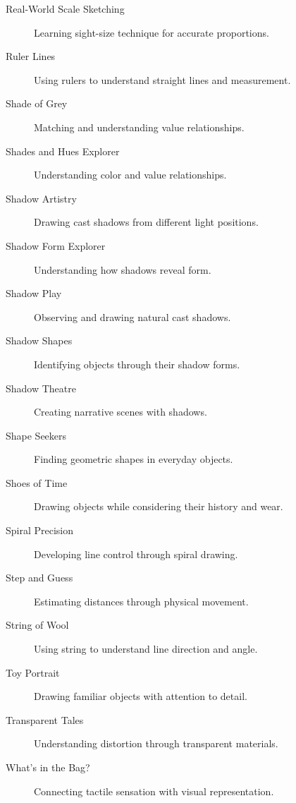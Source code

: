 \documentclass{article}
\begin{document}
\begin{description}
    \item[Real-World Scale Sketching] Learning sight-size technique for accurate proportions.
    
    \item[Ruler Lines] Using rulers to understand straight lines and measurement.
    
    \item[Shade of Grey] Matching and understanding value relationships.
    
    \item[Shades and Hues Explorer] Understanding color and value relationships.
    
    \item[Shadow Artistry] Drawing cast shadows from different light positions.
    
    \item[Shadow Form Explorer] Understanding how shadows reveal form.
    
    \item[Shadow Play] Observing and drawing natural cast shadows.
    
    \item[Shadow Shapes] Identifying objects through their shadow forms.
    
    \item[Shadow Theatre] Creating narrative scenes with shadows.
    
    \item[Shape Seekers] Finding geometric shapes in everyday objects.
    
    \item[Shoes of Time] Drawing objects while considering their history and wear.
    
    \item[Spiral Precision] Developing line control through spiral drawing.
    
    \item[Step and Guess] Estimating distances through physical movement.
    
    \item[String of Wool] Using string to understand line direction and angle.
    
    \item[Toy Portrait] Drawing familiar objects with attention to detail.
    
    \item[Transparent Tales] Understanding distortion through transparent materials.
    
    \item[What's in the Bag?] Connecting tactile sensation with visual representation.
    

\end{description}
\end{document}

